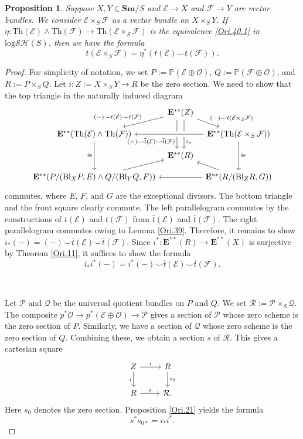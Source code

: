 \documentclass[11pt, a4paper]{amsart}
\newtheorem{prop}[thm]{Proposition}
\theoremstyle{definition}
\numberwithin{equation}{subsection}
\renewcommand{\P}{\mathbb{P}}
\newcommand{\Sm}{\mathbf{Sm}}
\newcommand{\Blow}{{\mathrm{Bl}}}
\newcommand{\Thom}{\mathrm{Th}}
\newcommand{\ol}{\overline}
\newcommand{\cE}{\mathcal{E}}
\newcommand{\cF}{\mathcal{F}}
\newcommand{\cO}{\mathcal{O}}
\newcommand{\cP}{\mathcal{P}}
\newcommand{\cQ}{\mathcal{Q}}
\newcommand{\cR}{\mathcal{R}}
\newcommand{\ringE}{\mathbf{E}}
\newcommand{\inflogSH}{\mathrm{log}\mathcal{SH}}
\begin{document}
\begin{prop}
\label{Ori.35}
Suppose $X,Y\in \Sm/S$ and $\cE\to X$ and $\cF\to Y$ are vector bundles.
We consider $\cE\times_S \cF$ as a vector bundle on $X\times_S Y$.
If $\eta\colon \Thom(\cE)\wedge \Thom(\cF)\to \Thom(\cE\times_S \cF)$ is the equivalence \eqref{Ori.40.1} in $\inflogSH(S)$, then we have the formula
\[
t(\cE\times_S \cF)
=
\eta^*(t(\cE)\smile t(\cF)).
\]
\end{prop}
\begin{proof}
For simplicity of notation, we set $P:=\P(\cE\oplus \cO)$, $Q:=\P(\cF\oplus \cO)$, and $R:=P\times_S Q$.
Let $i\colon Z:=X\times_S Y\to R$ be the zero section.
We need to show that the top triangle in the naturally induced diagram
\[
\begin{tikzcd}[column sep=tiny, row sep=small]
&
\ringE^{**}(Z)\ar[ld,"(-)\smile t(\cE)\smile t(\cF)"'] \ar[rd,"(-)\smile t(\cE\times_S \cF)"] \ar[dd,"i_*",near end,shift left=1ex] \ar[dd,"(-)\smile \ol{t}(\cE)\smile \ol{t}(\cF)"',shift right=1ex,near end]
\\
\ringE^{**}(\Thom(\cE)\wedge \Thom(\cF))\ar[rr,crossing over,leftarrow]\ar[dd,"\cong"']&
&
\ringE^{**}(\Thom(\cE\times_S \cF))\ar[dd,"\cong"]
\\
&
\ringE^{**}(R)\ar[rd,leftarrow]\ar[ld,leftarrow]
\\
\ringE^{**}(P/(\Blow_X P,E)\wedge Q/(\Blow_Y Q,F))\ar[rr,leftarrow]&
&
\ringE^{**}(R/(\Blow_Z R,G))
\end{tikzcd}
\]
commutes, where $E$, $F$, and $G$ are the exceptional divisors.
The bottom triangle and the front square clearly commute.
The left parallelogram commutes by the constructions of $t(\cE)$ and $t(\cF)$ from $\ol{t}(\cE)$ and $\ol{t}(\cF)$.
The right parallelogram commutes owing to Lemma \ref{Ori.39}.
Therefore, it remains to show $i_*(-)=(-)\smile \ol{t}(\cE)\smile \ol{t}(\cF)$.
Since $i^*\colon \ringE^{**}(R)\to \ringE^{**}(X)$ is surjective by Theorem \ref{Ori.11}, 
it suffices to show the formula
\begin{equation}
\label{Ori.35.3}
i_*i^*(-)
=
i^*(-)\smile \ol{t}(\cE)\smile \ol{t}(\cF).
\end{equation}

\

Let $\cP$ and $\cQ$ be the universal quotient bundles on $P$ and $Q$.
We set $\cR:=\cP\times_S \cQ$.
The composite $p^* \cO \to p^*(\cE\oplus \cO)\to \cP$ gives a section of $\cP$ whose zero scheme is the zero section of $P$.
Similarly, 
we have a section of $\cQ$ whose zero scheme is the zero section of $Q$.
Combining these, we obtain a section $s$ of $\cR$.
This gives a cartesian square
\[
\begin{tikzcd}
Z\ar[r,"i"]\ar[d,"i"']&
R\ar[d,"s_0"]
\\
R\ar[r,"s"]&
\cR.
\end{tikzcd}
\]
Here $s_0$ denotes the zero section.
Proposition \ref{Ori.21} yields the formula
\begin{equation}
\label{Ori.35.4}
s^*s_{0*}=i_*i^*.
\end{equation}


\end{proof}
\end{document}
